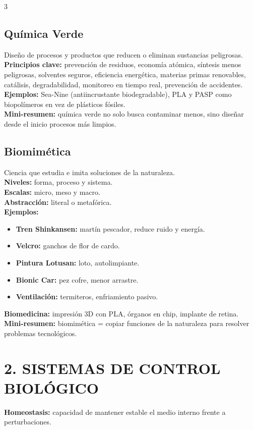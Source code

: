 \documentclass[9pt,landscape,letterpaper]{extarticle}
\begin{document}
\begin{multicols*}{3}
	\subsection{Química Verde}
	Diseño de procesos y productos que reducen o eliminan sustancias peligrosas.\\
	\textbf{Principios clave:} prevención de residuos, economía atómica, síntesis menos peligrosas, solventes seguros, eficiencia energética, materias primas renovables, catálisis, degradabilidad, monitoreo en tiempo real, prevención de accidentes.\\
	\textbf{Ejemplos:} Sea-Nine (antiincrustante biodegradable), PLA y PASP como biopolímeros en vez de plásticos fósiles.\\
	\textbf{Mini-resumen:} química verde no solo busca contaminar menos, sino diseñar desde el inicio procesos más limpios.

	\subsection{Biomimética}
	Ciencia que estudia e imita soluciones de la naturaleza.\\
	\textbf{Niveles:} forma, proceso y sistema.\\
	\textbf{Escalas:} micro, meso y macro.\\
	\textbf{Abstracción:} literal o metafórica.\\
	\textbf{Ejemplos:}
	\begin{itemize}
		\item \textbf{Tren Shinkansen:} martín pescador, reduce ruido y energía.
		\item \textbf{Velcro:} ganchos de flor de cardo.
		\item \textbf{Pintura Lotusan:} loto, autolimpiante.
		\item \textbf{Bionic Car:} pez cofre, menor arrastre.
		\item \textbf{Ventilación:} termiteros, enfriamiento pasivo.
	\end{itemize}
	\textbf{Biomedicina:} impresión 3D con PLA, órganos en chip, implante de retina.\\
	\textbf{Mini-resumen:} biomimética = copiar funciones de la naturaleza para resolver problemas tecnológicos.

	\section{2. SISTEMAS DE CONTROL BIOLÓGICO}
	\textbf{Homeostasis:} capacidad de mantener estable el medio interno frente a perturbaciones.


\end{multicols*}
\end{document}
